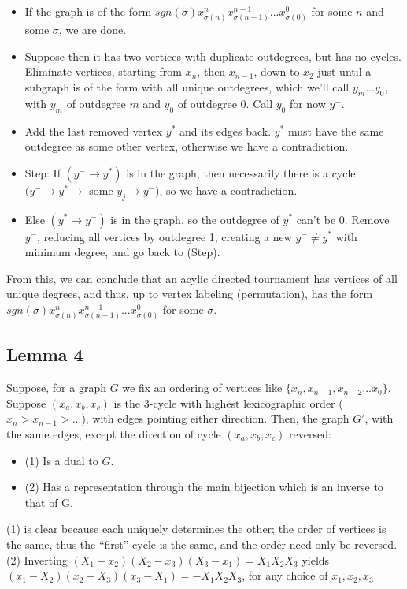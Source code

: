 \documentclass[11pt, oneside]{article} 	%
\begin{document}
\begin{itemize}
\item If the graph is of the form $sgn(\sigma) x_{\sigma(n)}^nx_{\sigma(n-1)}^{n-1}  ... x_{\sigma(0)}^{0}$ for some $n$ and some $\sigma$, we are done.
\item Suppose then it has two vertices with duplicate outdegrees, but has no cycles. Eliminate vertices, starting from $x_n$, then $x_{n-1}$, down to $x_2$ just until a subgraph is of the form with all unique outdegrees, which we'll call $y_{m} ... y_0$, with $y_m$ of outdegree $m$ and $y_0$ of outdegree 0.  Call $y_0$ for now $y^-$.
\item Add the last removed vertex $y^*$ and its edges back.  $y^*$ must have the same outdegree as some other vertex, otherwise we have a contradiction.
\item Step: If $(y^- \rightarrow y^*)$ is in the graph, then necessarily there is a cycle $(y^- \rightarrow y^* \rightarrow $ some $y_j \rightarrow y^-)$, so we have a contradiction.
\item Else $(y^* \rightarrow y^-)$ is in the graph, so the outdegree of $y^*$ can't be 0.  Remove $y^-$, reducing all vertices by outdegree 1, creating a new $y^- \neq y^*$ with minimum degree, and go back to (Step).
\end{itemize}

From this, we can conclude that an acylic directed tournament has vertices of all unique degrees, and thus, up to vertex labeling (permutation), has the form $sgn(\sigma) x_{\sigma(n)}^nx_{\sigma(n-1)}^{n-1}  ... x_{\sigma(0)}^{0}$  for some $\sigma$.

\subsection{Lemma 4}

Suppose, for a graph $G$ we fix an ordering of vertices like $\{x_n, x_{n-1}, x_{n-2}... x_0\}$.  Suppose $(x_a, x_b, x_c)$ is the 3-cycle with highest lexicographic order ($x_n > x_{n-1} > ...$), with edges pointing either direction.  Then, the graph $G'$, with the same edges, except the direction of cycle  $(x_a, x_b, x_c)$ reversed:
\begin{itemize}
\item (1) Is a dual to $G$.
\item (2) Has a representation through the main bijection which is an inverse to that of G.
\end{itemize}

(1) is clear because each uniquely determines the other; the order of vertices is the same, thus the ``first'' cycle is the same, and the order need only be reversed.
\\
(2) Inverting $(X_1 - x_2)(X_2-x_3)(X_3-x_1) = X_1X_2X_3$ yields $(x_1 - X_2)(x_2-X_3)(x_3-X_1) = -X_1X_2X_3$, for any choice of $x_1, x_2, x_3$
\end{document}

